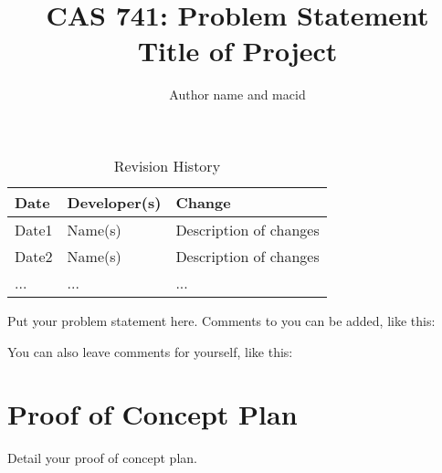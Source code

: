 \documentclass{article}
\title{CAS 741: Problem Statement\\Title of Project}
\author{Author name and macid}
\date{}
\begin{document}
\maketitle

\begin{table}[hp]
\caption{Revision History} \label{TblRevisionHistory}
\begin{tabularx}{\textwidth}{llX}
\toprule
\textbf{Date} & \textbf{Developer(s)} & \textbf{Change}\\
\midrule
Date1 & Name(s) & Description of changes\\
Date2 & Name(s) & Description of changes\\
... & ... & ...\\
\bottomrule
\end{tabularx}
\end{table}

Put your problem statement here.  Comments to you can be added, like this:


You can also leave comments for yourself, like this:


\section{Proof of Concept Plan}

Detail your proof of concept plan.
\end{document}
